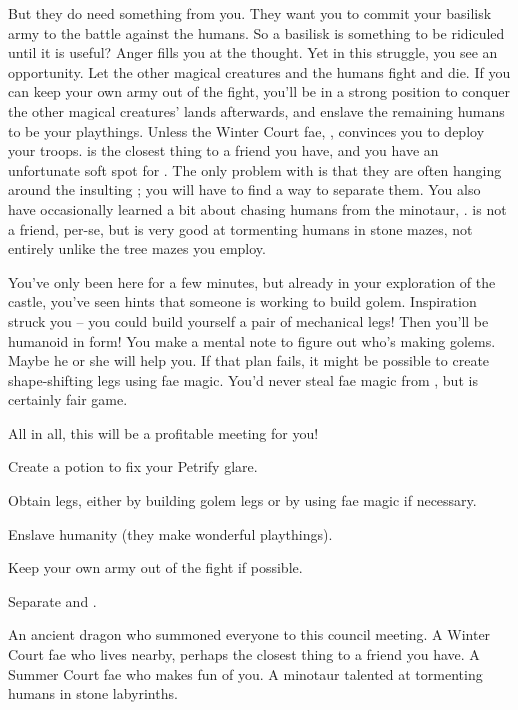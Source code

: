 \documentclass[char]{guildcamp2}
\begin{document}
But they do need something from you.  They want you to commit your basilisk army to the battle against the humans.  So a basilisk is something to be ridiculed until it is useful?  Anger fills you at the thought.  Yet in this struggle, you see an opportunity.  Let the other magical creatures and the humans fight and die.  If you can keep your own army out of the fight, you'll be in a strong position to conquer the other magical creatures' lands afterwards, and enslave the remaining humans to be your playthings.  Unless the Winter Court fae, \cBabyFae{\intro}, convinces you to deploy your troops.  \cBabyFae{\They} is the closest thing to a friend you have, and you have an unfortunate soft spot for \cBabyFae{\them}. The only problem with \cBabyFae{} is that they are often hanging around the insulting \cTreeFae{}; you will have to find a way to separate them. You also have occasionally learned a bit about chasing humans from the minotaur, \cMinotaur{}. \cMinotaur{} is not a friend, per-se, but \cMinotaur{\they} is very good at tormenting humans in stone mazes, not entirely unlike the tree mazes you employ.

You've only been here for a few minutes, but already in your exploration of the castle, you've seen hints that someone is working to build golem.  Inspiration struck you -- you could build yourself a pair of mechanical legs!  Then you'll be humanoid in form!  You make a mental note to figure out who's making golems.  Maybe he or she will help you.  If that plan fails, it might be possible to create shape-shifting legs using fae magic.  You'd never steal fae magic from \cBabyFae{}, but \cTreeFae{} is certainly fair game.

All in all, this will be a profitable meeting for you!


\begin{itemz}[Goals]
  \item Create a potion to fix your Petrify glare.
  \item Obtain legs, either by building golem legs or by using fae magic if necessary.
  \item Enslave humanity (they make wonderful playthings).
  \item Keep your own army out of the fight if possible.
  \item Separate \cBabyFae{} and \cTreeFae{}.
\end{itemz}

\begin{contacts}
  \contact{\cOnyx{}} An ancient dragon who summoned everyone to this council meeting.
  \contact{\cBabyFae{}} A Winter Court fae who lives nearby, perhaps the closest thing to a friend you have.
  \contact{\cTreeFae{}} A Summer Court fae who makes fun of you.
  \contact{\cMinotaur{}} A minotaur talented at tormenting humans in stone labyrinths.
\end{contacts}
\end{document}
